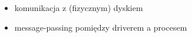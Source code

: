 \begin{itemize}
    \item komunikacja z (fizycznym) dyskiem
    \item message-passing pomiędzy driverem a procesem
\end{itemize}